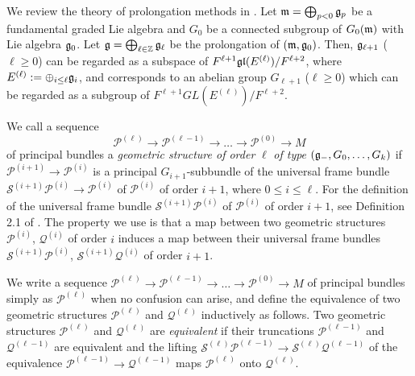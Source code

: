 \documentclass[12pt]{amsart}
\theoremstyle{plain}
\theoremstyle{definition}
\begin{document}
 We review the theory of prolongation methods in \cite{HM}. Let $\frak m=\bigoplus_{p<0} \frak g_p$ be a fundamental graded Lie algebra and $G_0$ be a connected subgroup of $G_0(\frak m)$ with Lie algebra $\frak g_0$. Let $\frak g=\bigoplus_{\ell \in \mathbb Z} \frak g_{\ell}$ be the prolongation of $(\frak m, \frak g_0)$.
 Then,    $\frak g_{\ell+1}$ ($\ell \geq 0$) can be regarded as a subspace of $F^{\ell+1}\frak{gl}(E^{(\ell)})/F^{\ell+2}$,  where $E^{(\ell)}:=\oplus_{i \leq \ell}\frak g_i$, %
  and    corresponds to an abelian    group  $G_{\ell+1}$ ($\ell \geq 0$)  which can be regarded as a subgroup of $ F^{\ell+1}GL(E^{(\ell)})/F^{\ell+2}$.

  We call a sequence $$\mathscr P^{(\ell)} \longrightarrow \mathscr P^{(\ell-1)} \longrightarrow \dots \longrightarrow \mathscr P^{(0)} \longrightarrow M$$ of principal bundles   a {\it geometric structure of order} $\ell$ {\it of type} $(\frak g_-, G_0, \dots, G_k)$ if   $\mathscr P^{(i+1)} \rightarrow \mathscr P^{(i)}$ is a principal $G_{i+1}$-subbundle of the universal  frame bundle $\mathscr S^{(i+1)} \mathscr P^{(i)} \rightarrow \mathscr P^{(i)}$  of $\mathscr P^{(i)}$ of order $i+1$, where $0 \leq i \leq \ell$.
   For the definition of the universal frame bundle $\mathscr S^{(i+1)} \mathscr P^{(i)}$ of $\mathscr P^{(i)}$ of order $i+1$, see Definition 2.1 of  \cite{HM}.  The property we use is that a map between two geometric structures $\mathscr P^{(i)} $, $\mathscr Q^{(i)}$ of order $i$ induces a map between their universal frame bundles $\mathscr S^{(i+1)}\mathscr P^{(i)}$, $ \mathscr S^{(i+1)}\mathscr Q^{(i)}$ of order $i+1$.

 We write a  sequence $\mathscr P^{(\ell)} \longrightarrow \mathscr P^{(\ell-1)} \longrightarrow \dots \longrightarrow \mathscr P^{(0)} \longrightarrow M$ of principal bundles simply as $\mathscr P^{(\ell)}$ when no confusion can arise, and define the equivalence of two geometric structures $\mathscr P^{(\ell)} $ and $\mathscr Q^{(\ell)} $  inductively as follows.
Two geometric structures $\mathscr P^{(\ell)}$ and $\mathscr Q^{(\ell)}$ are {\it equivalent} if their truncations $\mathscr P^{(\ell-1)}$ and $\mathscr Q^{(\ell-1)}$ are equivalent and the lifting $\mathscr S^{(\ell)} \mathscr P^{(\ell-1)} \rightarrow \mathscr S^{(\ell)} \mathscr Q^{(\ell-1)}$ of the equivalence $\mathscr P^{(\ell-1)} \rightarrow \mathscr Q^{(\ell-1)}$  maps $\mathscr P^{(\ell)}$ onto $\mathscr Q^{(\ell)}$. \\
\end{document}
